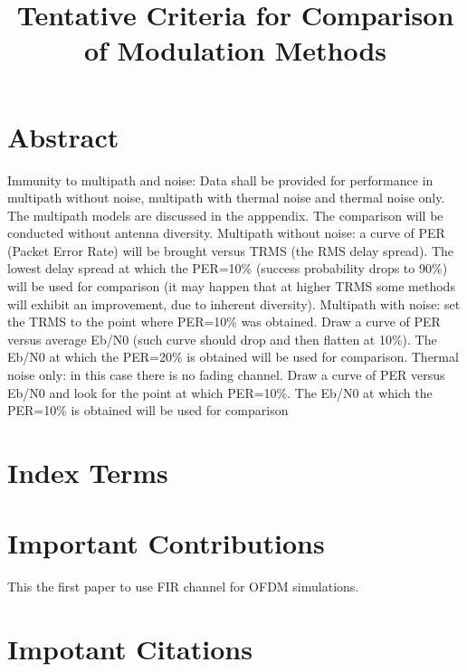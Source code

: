 \documentclass[11pt,draftnofoot,onecolumn]{IEEEtran}
\def\spacingset#1{\def\baselinestretch{#1}\small\normalsize}
\begin{document}
\spacingset{1.5}


\title{Tentative Criteria for Comparison of Modulation Methods}
%
\author{
\IEEEauthorblockA{} %
}
%
%
\maketitle%
%


\section*{Abstract}

Immunity to multipath and noise: Data shall be provided for performance in multipath without noise, multipath with thermal noise and thermal noise only. The multipath models are discussed in the apppendix. The comparison will be conducted without antenna diversity. Multipath without noise: a curve of PER (Packet Error Rate) will be brought versus TRMS (the RMS delay spread). The lowest delay spread at which the PER=10\% (success probability drops to 90\%) will be used for comparison (it may happen that at higher TRMS some methods will exhibit an improvement, due to inherent diversity). Multipath with noise: set the TRMS to the point where PER=10\% was obtained. Draw a curve of PER versus average Eb/N0 (such curve should drop and then flatten at 10\%). The Eb/N0 at which the PER=20\% is obtained will be used for comparison. Thermal noise only: in this case there is no fading channel. Draw a curve of PER versus Eb/N0 and look for the point at which PER=10\%. The Eb/N0 at which the PER=10\% is obtained will be used for comparison


\section*{ Index Terms}



\section*{Important Contributions}

This the first paper to use FIR channel for OFDM simulations.


\section*{Impotant Citations}







\end{document}
